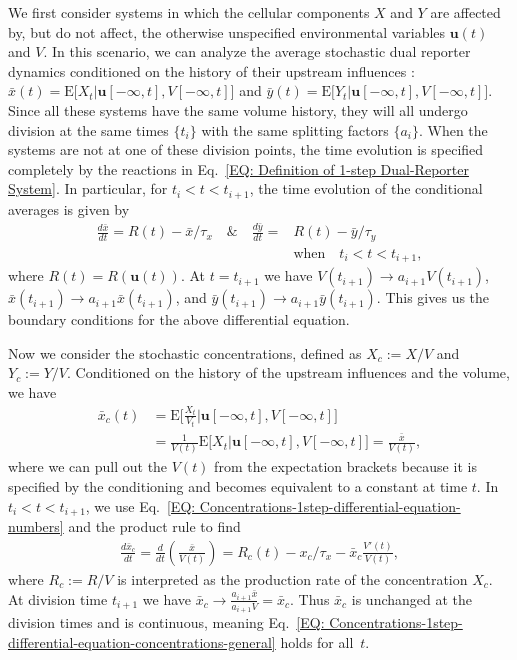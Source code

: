 \documentclass[%
 reprint,prx,
superscriptaddress,
%
%
%
%
%
%
%
%
%
 amsmath,amssymb,
 aps,
%
%
%
%
%
%
]{revtex4-2}
\begin{document}
{{We first consider systems in which the cellular components $X$ and $Y$ are affected by, but
do not affect, the otherwise unspecified environmental variables $\mathbf{u}(t)$ and $V$. In this scenario, we can analyze the average stochastic
dual reporter dynamics conditioned on the history of their upstream influences \cite{Hilfinger2012}:
$
\bar{x}(t) = \mathrm{E}\big[X_t|\mathbf{u}[-\infty,t], V[-\infty,t] \big]$ and  $\bar{y}(t) = \mathrm{E}\big[ Y_t|\mathbf{u}[-\infty,t] , V[-\infty,t]\big]$.
Since all these systems have the same volume history, they will all undergo division at the same times $\{t_{i}\}$ with the same splitting factors $\{a_{i}\}$. When the systems are not at one of these division points, 
the time evolution is specified completely by the reactions in Eq.~\eqref{EQ: Definition of 1-step Dual-Reporter System}. In particular, for $t_{i} < t < t_{i+1}$, the time evolution of the conditional averages is given by
\begin{align}
 \frac{d\bar{x}}{dt} = R(t) - \bar{x}/\tau_{x} \quad \text{\&} \quad \frac{d\bar{y}}{dt} =& R(t) - \bar{y}/\tau_{y} \label{EQ: Concentrations-1step-differential-equation-numbers}\\ 
 &\text{when}  \quad  t_{i} < t < t_{i+1}, \nonumber
\end{align}
where $R(t) = R(\mathbf{u}(t))$. At $t = t_{i+1}$ we have $V(t_{i+1}) \to a_{i+1}V(t_{i+1})$, $\bar{x}(t_{i+1}) \to a_{i+1}\bar{x}(t_{i+1})$, 
and $\bar{y}(t_{i+1}) \to a_{i+1}\bar{y}(t_{i+1})$. This gives us the boundary conditions for the above differential equation.

Now we consider the stochastic concentrations, defined as $X_{c} := X/V$ and $Y_{c} := Y/V$. Conditioned on the history of the upstream influences and the volume, we have 
\begin{align*}
 \bar{x}_{c}(t) &=  \mathrm{E}\Big[\frac{X_t}{V_{t}}\Big|\mathbf{u}[-\infty,t], V[-\infty,t] \Big]\\
	        &=  \frac{1}{V(t)}\mathrm{E}\big[X_t|\mathbf{u}[-\infty,t], V[-\infty,t] \big]
	        =  \frac{\bar{x}}{V(t)} ,
\end{align*}
where we can pull out the $V(t)$ from the expectation brackets because it is specified by the conditioning and becomes equivalent to a constant at time $t$.
In $t_{i} < t < t_{i+1}$, we use Eq.~\eqref{EQ: Concentrations-1step-differential-equation-numbers} and the product rule to find 
\begin{align}
 \frac{d\bar{x}_{c}}{dt} = \frac{d}{dt}\left(\frac{\bar{x}}{V(t)}\right) = R_{c}(t) - x_{c}/\tau_{x} - \bar{x}_{c}\frac{V'(t)}{V(t)} ,
 \label{EQ: Concentrations-1step-differential-equation-concentrations-general}
\end{align}
where $R_{c} := R/V$ is interpreted as the production rate of the concentration $X_{c}$. At division time $t_{i+1}$ we have $\bar{x}_{c} \to \frac{a_{i+1}\bar{x}}{a_{i+1}V} = \bar{x}_{c}$. 
Thus $\bar{x}_{c}$ is unchanged at the division times and is continuous, meaning Eq.~\eqref{EQ: Concentrations-1step-differential-equation-concentrations-general} holds for all~$t$. 

}}
\end{document}
